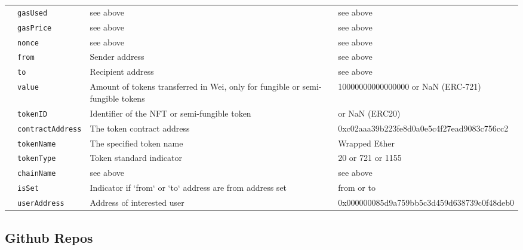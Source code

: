 \documentclass[12pt,a4paper,titlepage,oneside,english]{article}
\begin{document}
\begin{table}[h!]
\begin{tabular}{ll p{4cm} p{5.5cm}}
     & \texttt{gasUsed} & see above &  see above\\
     & \texttt{gasPrice} & see above & see above \\
     & \texttt{nonce} &  see above & see above \\
     & \texttt{from} &  Sender address & see above \\
     & \texttt{to} &  Recipient address & see above \\
     & \texttt{value} & Amount of tokens transferred in Wei, only for fungible or semi-fungible tokens & 10000000000000000 or NaN (ERC-721) \\
     & \texttt{tokenID} &  Identifier of the NFT or semi-fungible token &  or NaN (ERC20) \\
     & \texttt{contractAddress} & The token contract address &  0xc02aaa39b223fe8d0a0e5c4f27ead9083c756cc2 \\
     & \texttt{tokenName} & The specified token name &  Wrapped Ether\\
     & \texttt{tokenType} & Token standard indicator &  20 or 721 or 1155\\
     & \texttt{chainName} & see above &  see above \\
     & \texttt{isSet} & Indicator if `from` or `to` address are from address set &  from or to \\
     & \texttt{userAddress} & Address of interested user & 0x000000085d9a759bb5c3d459d638739c0f48deb0\\
    \hline
  \end{tabular}
\end{table}


\subsection{Github Repos}
\end{document}
